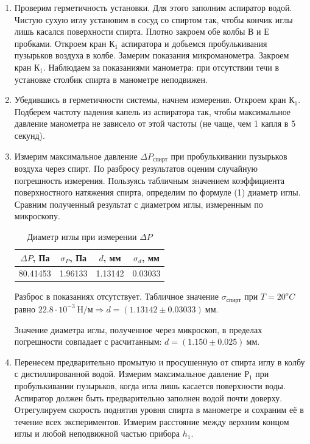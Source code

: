 \documentclass[12pt,a4paper]{article}
\begin{document}
\begin{enumerate}
    \item Проверим герметичность установки. Для этого заполним аспиратор водой. Чистую сухую иглу установим в сосуд со спиртом так, чтобы кончик иглы лишь касался поверхности спирта. Плотно закроем обе колбы В и Е пробками. Откроем кран $К_1$ аспиратора и добьемся пробулькивания пузырьков воздуха в колбе. Замерим показания микроманометра. Закроем кран $К_1$. Наблюдаем за показаниями манометра: при отсутствии течи в установке столбик спирта в манометре неподвижен. 
    
    \item Убедившись в герметичности системы, начнем измерения. Откроем кран $К_1$. Подберем частоту падения капель из аспиратора так, чтобы максимальное давление манометра не зависело от этой частоты (не чаще, чем 1 капля в 5 секунд).

    \item Измерим максимальное давление $\Delta P_{спирт}$ при  пробулькивании пузырьков воздуха через спирт. По разбросу результатов оценим случайную погрешность измерения. Пользуясь табличным значением коэффициента поверхностного натяжения спирта, определим по формуле (1) диаметр иглы. Сравним полученный результат с диаметром иглы, измеренным по микроскопу.
    
    \begin{table}[ht]
        \centering
        \begin{tabular}{|c|c|c|c|}
            \hline
            $\Delta P$, Па & $\sigma_P$, Па & $d$, мм & $\sigma_d$, мм \\
            \hline
             80.41453 & 1.96133 & 1.13142& 0.03033\\
             \hline
        \end{tabular}
        \caption{Диаметр иглы при измерении $\Delta P$}
        \label{tab:my_label}
    \end{table}
    Разброс в показаниях отсутствует.
    Табличное значение $\sigma_{спирт} $ при $T=20^oC$ равно $22.8 \cdot 10^{-3}\ Н/м\Rightarrow d = (1.13142 \pm 0.03033)\ мм$.
    
    Значение диаметра иглы, полученное через микроскоп, в пределах погрешности совпадает с расчитанным: $d = (1.150 \pm 0.025)\ мм$.
    
    \item Перенесем предварительно промытую и просушенную от спирта иглу в колбу с дистиллированной водой. Измерим максимальное давление $Р_1$ при пробулькивании пузырьков, когда игла лишь касается поверхности воды. Аспиратор должен быть предварительно  заполнен водой почти доверху. Отрегулируем скорость поднятия уровня спирта в манометре и сохраним её в течение всех экспериментов. Измерим расстояние между верхним концом иглы и любой неподвижной частью прибора $h_1$.
    

\end{enumerate}
\end{document}
